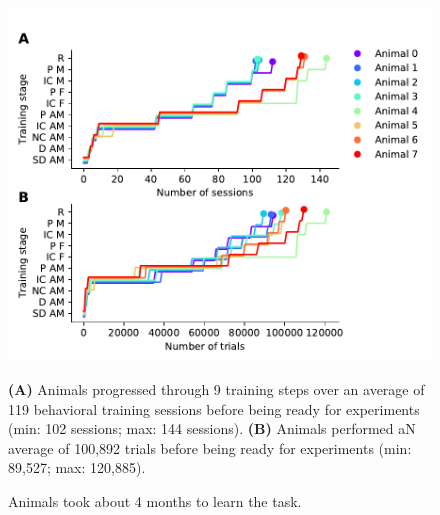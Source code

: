 \begin{figure}[hp] \begin{center}
	\includegraphics[width=6in]{figures/chapter4/figure_training}%
\end{center} \caption{Animals took about 4 months to learn the
task.}{\textbf{(A)} Animals progressed through 9 training steps over an average
of 119 behavioral training sessions before being ready for experiments (min:
102 sessions; max: 144 sessions). 
%
\textbf{(B)} Animals performed aN average of 100,892 trials before being ready
for experiments (min: 89,527; max: 120,885). 
%
} \end{figure}

